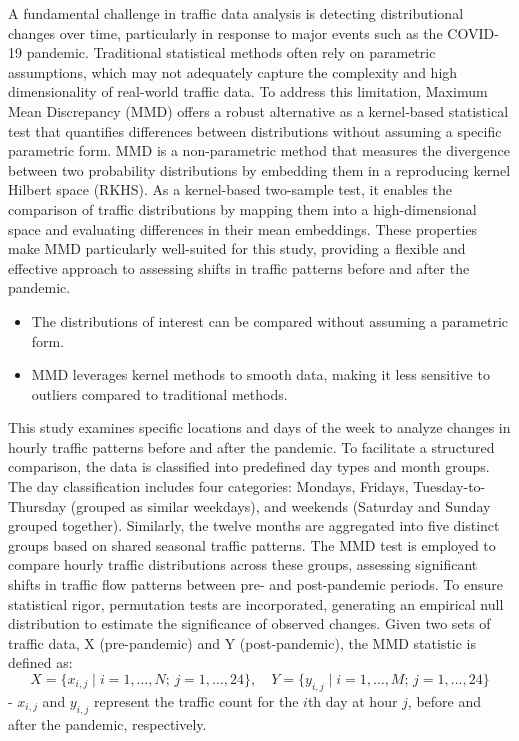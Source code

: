 \documentclass{article}
\begin{document}
A fundamental challenge in traffic data analysis is detecting distributional changes over time, particularly in response to major events such as the COVID-19 pandemic. Traditional statistical methods often rely on parametric assumptions, which may not adequately capture the complexity and high dimensionality of real-world traffic data. To address this limitation, Maximum Mean Discrepancy (MMD) offers a robust alternative as a kernel-based statistical test that quantifies differences between distributions without assuming a specific parametric form.
MMD is a non-parametric method that measures the divergence between two probability distributions by embedding them in a reproducing kernel Hilbert space (RKHS). As a kernel-based two-sample test, it enables the comparison of traffic distributions by mapping them into a high-dimensional space and evaluating differences in their mean embeddings. These properties make MMD particularly well-suited for this study, providing a flexible and effective approach to assessing shifts in traffic patterns before and after the pandemic.
\begin{itemize}
    \item The distributions of interest can be compared without assuming a parametric form.
    \item MMD leverages kernel methods to smooth data, making it less sensitive to outliers compared to traditional methods. 
\end{itemize}
This study examines specific locations and days of the week to analyze changes in hourly traffic patterns before and after the pandemic. To facilitate a structured comparison, the data is classified into predefined day types and month groups. The day classification includes four categories: Mondays, Fridays, Tuesday-to-Thursday (grouped as similar weekdays), and weekends (Saturday and Sunday grouped together). Similarly, the twelve months are aggregated into five distinct groups based on shared seasonal traffic patterns. The MMD test is employed to compare hourly traffic distributions across these groups, assessing significant shifts in traffic flow patterns between pre- and post-pandemic periods. To ensure statistical rigor, permutation tests are incorporated, generating an empirical null distribution to estimate the significance of observed changes.
Given two sets of traffic data,  X  (pre-pandemic) and   Y  (post-pandemic), the MMD statistic is defined as:
$$
X = \{ x_{i,j} \mid i = 1, \dots, N; \, j = 1, \dots, 24 \}, \quad
Y = \{ y_{i,j} \mid i = 1, \dots, M; \, j = 1, \dots, 24 \}
$$
- $x_{i,j}$ and $y_{i,j}$ represent the traffic count for the $i$th day at hour $j$, before and after the pandemic, respectively.
\end{document}
